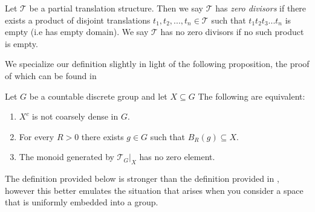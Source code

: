 \begin{corollary}
\begin{definition}\label{def:ZD1}
Let $\mathcal{T}$ be a partial translation structure. Then we say $\mathcal{T}$ has \textit{zero divisors} if there exists a product of disjoint translations $t_{1},t_{2},...,t_{n} \in \mathcal{T}$ such that $t_{1}t_{2}t_{3}...t_{n}$ is empty (i.e has empty domain). We say $\mathcal{T}$ has no zero divisors if no such product is empty.
\end{definition}
We specialize our definition slightly in light of the following proposition, the proof of which can be found in \cite[Proposition 8.1]{rosiesthesis}

\begin{proposition}\label{prop:TFAE} Let $G$ be a countable discrete group and let $X \subseteq G$
The following are equivalent:
\begin{enumerate}
\item $X^{c}$ is not coarsely dense in $G$.
\item For every $R>0$ there exists $g \in G$ such that $B_{R}(g) \subseteq X$.
\item The monoid generated by $\mathcal{T}_{G}|_{X}$ has no zero element.
\end{enumerate}
\end{proposition}
The definition provided below is stronger than the definition provided in \cite{MR2363428}, however this better emulates the situation that arises when you consider a space that is uniformly embedded into a group.


\end{corollary}

